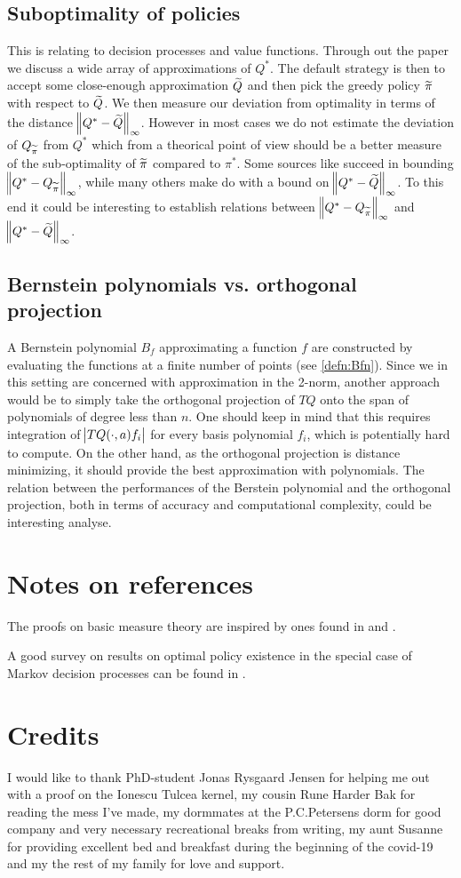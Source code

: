 \subsection{Suboptimality of policies}
This is relating to decision processes and value functions.
Through out the paper we discuss a wide array of
approximations of $Q^*$.
The default strategy is then to accept some close-enough approximation $\widetilde{Q}$
and then pick the greedy policy $\widetilde{\pi}$ with respect to $\widetilde{Q}$.
We then measure our deviation from optimality in terms of the distance
$\norm{Q^* - \widetilde{Q}}_\infty$.
However in most cases we do not estimate the deviation of
$Q_{\widetilde{\pi}}$ from $Q^*$ which from a theorical point of view should be
a better measure of the sub-optimality of $\widetilde{\pi}$ compared to $\pi^*$.
Some sources like  succeed in bounding
$\norm{Q^* - Q_{\widetilde{\pi}}}_\infty$,
while many others make do with a bound on $\norm{Q^* - \widetilde{Q}}_\infty$.
To this end it could be interesting to establish relations
between $\norm{Q^* - Q_{\widetilde{\pi}}}_\infty$ and $\norm{Q^* - \widetilde{Q}}_\infty$.

\subsection{Bernstein polynomials vs. orthogonal projection}
A Bernstein polynomial $B_f$ approximating a function $f$
are constructed by evaluating the
functions at a finite number of points (see \cref{defn:Bfn}).
Since we in this setting are concerned with approximation in the 2-norm,
another approach would be to simply take the orthogonal projection of
$TQ$ onto the span of polynomials of degree less than $n$.
One should keep in mind that this requires integration of
$\abs{TQ(\cdot, a) f_i}$ for every basis polynomial $f_i$,
which is potentially hard to compute.
On the other hand, as the orthogonal projection is distance minimizing,
it should provide the best approximation with polynomials.
The relation between the performances of the Berstein polynomial
and the orthogonal projection, both in terms of accuracy and 
computational complexity, could be interesting analyse.


\section{Notes on references}
The proofs on basic measure theory are inspired by ones found in
 and .

A good survey on results on optimal policy existence in the special case
of Markov decision processes can be found in .

\section{Credits}
I would like to thank PhD-student Jonas Rysgaard Jensen for helping me
out with a proof on the Ionescu Tulcea kernel,
my cousin Rune Harder Bak for reading the mess I've made,
my dormmates at the P.C.Petersens dorm for good company and very necessary
recreational breaks from writing,
my aunt Susanne for providing excellent bed and breakfast during the beginning
of the covid-19 and
my the rest of my family for love and support.


